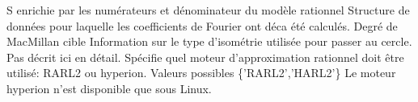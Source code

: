 %
%
%
%
%
%
%
%
{\fitem[SS] S enrichie par les num\'erateurs et d\'enominateur du mod\`ele rationnel}
{\fitem[S] Structure de donn\'ees pour laquelle les coefficients de Fourier
ont d\'eca \'et\'e calcul\'es. 
\fitem[n] Degr\'e de MacMillan cible}
{\fitem[Is\_type=DVC.RA.divide\_by\_z\_minus\_one] Information sur le type
d'isom\'etrie utilis\'ee pour passer au cercle. Pas d\'ecrit ici en d\'etail.
\fitem[solver=DVC.RA.solver\_flag] Sp\'ecifie quel moteur d'approximation
rationnel doit \^etre utilis\'e: RARL2 ou hyperion. Valeurs possibles \{'RARL2','HARL2'\}}  
{Le moteur hyperion n'est disponible que sous Linux. }
 
